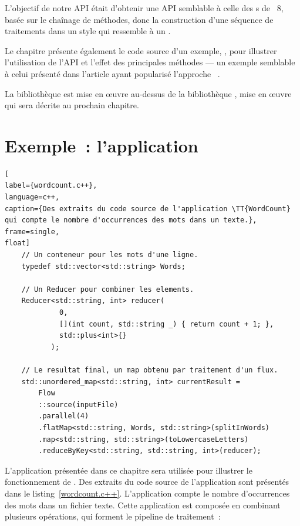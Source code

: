 L'objectif de notre API \'etait d'obtenir une API semblable \`a celle des s de ~8, bas\'ee sur le cha\^inage de m\'ethodes, donc la construction d'une séquence de traitements dans un style qui ressemble \`a un .


Le chapitre pr\'esente \'egalement le code source d'un exemple, , pour illustrer l'utilisation de l'API et l'effet des principales m\'ethodes --- un exemple semblable à celui présenté dans l'article ayant popularisé l'approche ~\citep{DeanGhe04}.

La biblioth\`eque \PpFf{} est mise en \oe{}uvre au-dessus de la biblioth\`eque , mise en \oe{}uvre qui sera d\'ecrite au prochain chapitre.




\section{Exemple~: l'application }
\label{descriptionWordCount.sect}


\begin{lstlisting}[
label={wordcount.c++},
language=c++,
caption={Des extraits du code source de l'application \TT{WordCount} qui compte le nombre d'occurrences des mots dans un texte.},
frame=single,
float]
    // Un conteneur pour les mots d'une ligne.
    typedef std::vector<std::string> Words;

    // Un Reducer pour combiner les elements.
    Reducer<std::string, int> reducer(
             0, 
             [](int count, std::string _) { return count + 1; },
             std::plus<int>{}
           );

    // Le resultat final, un map obtenu par traitement d'un flux.
    std::unordered_map<std::string, int> currentResult = 
        Flow
        ::source(inputFile)
        .parallel(4)
        .flatMap<std::string, Words, std::string>(splitInWords)			
        .map<std::string, std::string>(toLowercaseLetters)			
        .reduceByKey<std::string, std::string, int>(reducer); 
\end{lstlisting}

L'application  pr\'esent\'ee dans ce chapitre sera utilisée pour illustrer le fonctionnement de . Des extraits du code source de l'application sont présentés dans le listing~\ref{wordcount.c++}. L'application compte le nombre d'occurrences des mots dans un fichier texte. Cette application est compos\'ee en combinant plusieurs op\'erations, qui forment le pipeline de traitement~:  

